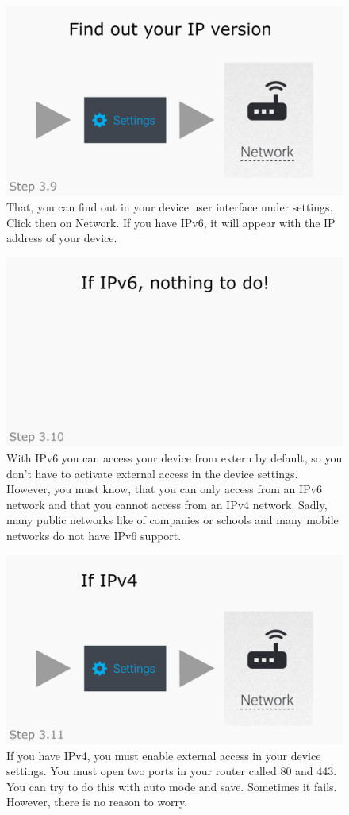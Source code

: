 \documentclass[a4paper,12pt]{article}
\begin{document}
\begin{figure}[htbp!]
	\centering
	\includegraphics[width=0.7\linewidth]{../frames/39.png}
	\caption{That, you can find out in your device user interface under settings. Click then on Network. If you have IPv6, it will appear with the IP address of your device.}
	\label{fig:27}
\end{figure}

\begin{figure}[htbp!]
	\centering
	\includegraphics[width=0.7\linewidth]{../frames/40.png}
	\caption{With IPv6 you can access your device from extern by default, so you don’t have to activate external access in the device settings. However, you must know, that you can only access from an IPv6 network and that you cannot access from an IPv4 network. Sadly, many public networks like of companies or schools and many mobile networks do not have IPv6 support.}
	\label{fig:28}
\end{figure}

\begin{figure}[htbp!]
	\centering
	\includegraphics[width=0.7\linewidth]{../frames/41.png}
	\caption{If you have IPv4, you must enable external access in your device settings. You must open two ports in your router called 80 and 443. You can try to do this with auto mode and save. Sometimes it fails. However, there is no reason to worry.}
	\label{fig:29}
\end{figure}
\end{document}
